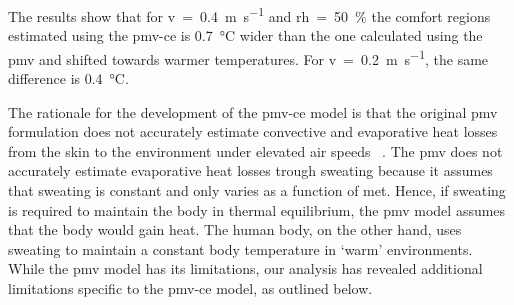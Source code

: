 The results show that for \ac{v}~=~\qty{0.4}{\m\per\s} and \ac{rh}~=~\qty{50}{\percent} the comfort regions estimated using the \ac{pmv-ce} is \qty{0.7}{\celsius} wider than the one calculated using the \ac{pmv} and shifted towards warmer temperatures.
For \ac{v}~=~\qty{0.2}{\m\per\s}, the same difference is \qty{0.4}{\celsius}.

The rationale for the development of the \ac{pmv-ce} model is that the original \ac{pmv} formulation does not accurately estimate convective and evaporative heat losses from the skin to the environment under elevated air speeds ~\cite{huang_applicability_2014}.
The \ac{pmv} does not accurately estimate evaporative heat losses trough sweating because it assumes that sweating is constant and only varies as a function of \ac{met}. 
Hence, if sweating is required to maintain the body in thermal equilibrium, the \ac{pmv} model assumes that the body would gain heat.
The human body, on the other hand, uses sweating to maintain a constant body temperature in `warm' environments.
While the \ac{pmv} model has its limitations, our analysis has revealed additional limitations specific to the \ac{pmv-ce} model, as outlined below.


